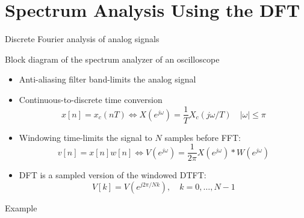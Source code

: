 \documentclass[10pt]{beamer}
\begin{document}
\section{Spectrum Analysis Using the DFT}
\begin{frame}{Discrete Fourier analysis of analog signals}

Block diagram of the spectrum analyzer of an oscilloscope
\begin{center}
	\resizebox{\textwidth}{!}{}
\end{center}

\begin{itemize}
	\item Anti-aliasing filter band-limits the analog signal 
	\item Continuous-to-discrete time conversion
	\begin{equation*}
		x[n] = x_c(nT) \Longleftrightarrow X(e^{j\omega}) = \frac{1}{T}X_c(j\omega/T) \quad |\omega| \leq \pi \tag{no aliasing}
	\end{equation*}
	\item Windowing time-limits the signal to $N$ samples before FFT: 
	\begin{equation*}
		v[n] = x[n]w[n] \Longleftrightarrow V(e^{j\omega}) = \frac{1}{2\pi} X(e^{j\omega}) \ast W(e^{j\omega})
	\end{equation*}
	\item DFT is a sampled version of the windowed DTFT:
	\begin{equation*}
		V[k] = V(e^{j2\pi/Nk}), \quad k = 0, \ldots, N-1
	\end{equation*}
\end{itemize}
\end{frame}

%
\begin{frame}{Example}
\centering
{}
\end{frame}
\end{document}
